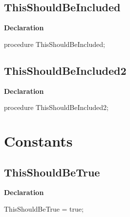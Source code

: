 \documentclass{report}
\begin{document}
\subsection*{ThisShouldBeIncluded}
\begin{list}{}{
\setlength{\itemindent}{0cm}
\setlength{\listparindent}{0cm}
\setlength{\leftmargin}{\evensidemargin}
\addtolength{\leftmargin}{\tmplength}
\settowidth{\labelsep}{X}
\addtolength{\leftmargin}{\labelsep}
\setlength{\labelwidth}{\tmplength}
}
\begin{flushleft}
\item[\textbf{Declaration}\hfill]
\begin{ttfamily}
procedure ThisShouldBeIncluded;\end{ttfamily}


\end{flushleft}
\end{list}
\subsection*{ThisShouldBeIncluded2}
\begin{list}{}{
\setlength{\itemindent}{0cm}
\setlength{\listparindent}{0cm}
\setlength{\leftmargin}{\evensidemargin}
\addtolength{\leftmargin}{\tmplength}
\settowidth{\labelsep}{X}
\addtolength{\leftmargin}{\labelsep}
\setlength{\labelwidth}{\tmplength}
}
\begin{flushleft}
\item[\textbf{Declaration}\hfill]
\begin{ttfamily}
procedure ThisShouldBeIncluded2;\end{ttfamily}


\end{flushleft}
\end{list}
\section{Constants}
\subsection*{ThisShouldBeTrue}
\begin{list}{}{
\setlength{\itemindent}{0cm}
\setlength{\listparindent}{0cm}
\setlength{\leftmargin}{\evensidemargin}
\addtolength{\leftmargin}{\tmplength}
\settowidth{\labelsep}{X}
\addtolength{\leftmargin}{\labelsep}
\setlength{\labelwidth}{\tmplength}
}
\begin{flushleft}
\item[\textbf{Declaration}\hfill]
\begin{ttfamily}
ThisShouldBeTrue = true;\end{ttfamily}


\end{flushleft}
\end{list}
\end{document}
